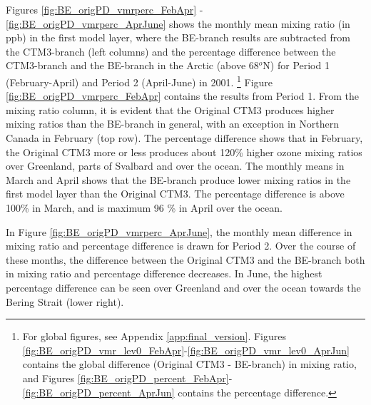 





\medskip
\medskip

Figures \ref{fig:BE_origPD_vmrperc_FebApr} - \ref{fig:BE_origPD_vmrperc_AprJune} shows the monthly mean mixing ratio (in ppb) in the first model layer, where the BE-branch results are subtracted from the CTM3-branch (left columns) and the percentage difference between the CTM3-branch and the BE-branch in the Arctic (above 68$^o$N) for Period 1 (February-April) and Period 2 (April-June) in 2001. \footnote{For global figures, see Appendix \ref{app:final_version}. Figures \ref{fig:BE_origPD_vmr_lev0_FebApr}-\ref{fig:BE_origPD_vmr_lev0_AprJun} contains the global difference (Original CTM3 - BE-branch) in mixing ratio, and Figures \ref{fig:BE_origPD_percent_FebApr}-\ref{fig:BE_origPD_percent_AprJun} contains the percentage difference.} Figure \ref{fig:BE_origPD_vmrperc_FebApr} contains the results from Period 1. From the mixing ratio column, it is evident that the Original CTM3 produces higher mixing ratios than the BE-branch in general, with an exception in Northern Canada in February (top row). The percentage difference shows that in February, the Original CTM3 more or less produces about 120\% higher ozone mixing ratios over Greenland, parts of Svalbard and over the ocean. The monthly means in March and April shows that the BE-branch produce lower mixing ratios in the first model layer than the Original CTM3. The percentage difference is above 100\% in March, and is maximum 96 \% in April over the ocean.

\medskip

In Figure \ref{fig:BE_origPD_vmrperc_AprJune}, the monthly mean difference in mixing ratio and percentage difference is drawn for Period 2. Over the course of these months, the difference between the Original CTM3 and the BE-branch both in mixing ratio and percentage difference decreases. In June, the highest percentage difference can be seen over Greenland and over the ocean towards the Bering Strait (lower right).





